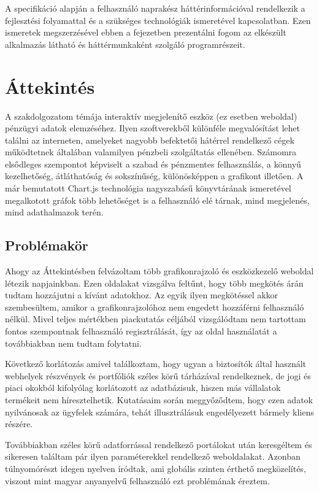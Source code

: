 
A specifikáció alapján a felhasználó naprakész háttérinformációval rendelkezik a fejlesztési folyamattal és a szükséges technológiák ismeretével kapcsolatban. Ezen ismeretek megszerzésével ebben a fejezetben prezentálni fogom az elkészült alkalmazás látható és háttérmunkaként szolgáló programrészeit.


\section{Áttekintés}

A szakdolgozatom témája interaktív megjelenítő eszköz (ez esetben weboldal) pénzügyi adatok elemzéséhez. Ilyen szoftverekből különféle megvalósítást lehet találni az interneten, amelyeket nagyobb befektetői hátérrel rendelkező cégek működtetnek általában valamilyen pénzbeli szolgáltatás ellenében. Számomra elsődleges szempontot képviselt a szabad és pénzmentes felhasználás, a könnyű kezelhetőség, átláthatóság és sokszínűség, különösképpen a grafikont illetően. A már bemutatott Chart.js technológia nagyszabásű könyvtárának ismeretével megalkotott gráfok több lehetőséget is a felhasználó elé tárnak, mind megjelenés, mind adathalmazok terén. 

\subsection{Problémakör}

Ahogy az Áttekintésben felvázoltam több grafikonrajzoló és eszközkezelő weboldal létezik napjainkban. Ezen oldalakat vizsgálva feltűnt, hogy több megkötés árán tudtam hozzájutni a kívánt adatokhoz. Az egyik ilyen megkötéssel akkor szembesültem, amikor a grafikonrajzolóhoz nem engedett hozzáférni felhasználó nélkül. Mivel teljes mértékben piackutatás céljából vizsgálódtam nem tartottam fontos szempontnak felhasználó regisztrálását, így az oldal használatát a továbbiakban nem tudtam folytatni.

	Következő korlátozás amivel találkoztam, hogy ugyan a biztosítók által használt webhelyek részvények és portfóliók széles körű tárházával rendelkeznek, de jogi és piaci okokból kifolyólag korlátozott az adatbázisuk, hiszen más vállalatok termékeit nem híresztelhetik. Kutatásaim során meggyőződtem, hogy ezen adatok nyilvánosak az ügyfelek számára, tehát illusztrálásuk engedélyezett bármely kliens részére.

	Továbbiakban széles körű adatforrással rendelkező portálokat után keresgéltem és sikeresen találtam pár ilyen paraméterekkel rendelkező weboldalakat. Azonban túlnyomórészt idegen nyelven íródtak, ami globális szinten érthető megközelítés, viszont mint magyar anyanyelvű felhasználó ezt problémának éreztem. 

